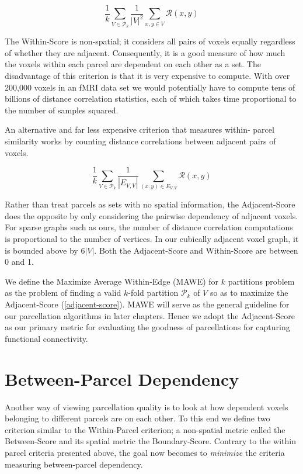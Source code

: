 \begin{definition} \label{within-score}
\[ \frac{1}{k} \sum_{V \in \mathcal{P}_k}
   \frac{1}{|V|^2} \sum_{x,y \in V} \mathcal{R}(x,y)
\]
\end{definition}

The Within-Score is non-spatial; it considers all pairs of voxels
equally regardless of whether they are adjacent. Consequently, it is a
good measure of how much the voxels within each parcel are dependent on
each other as a set. The disadvantage of this criterion is that it is
very expensive to compute. With over 200,000 voxels in an fMRI data set
we would potentially have to compute tens of billions of distance
correlation statistics, each of which takes time proportional to the
number of samples squared.

An alternative and far less expensive criterion that measures within-
parcel similarity works by counting distance correlations between
adjacent pairs of voxels.

\begin{definition} \label{adjacent-score}
\[ \frac{1}{k} \sum_{V \in \mathcal{P}_k}
   \frac{1}{|E_{V,V}|} \sum_{(x,y) \in E_{V,V}} \mathcal{R}(x,y)
\]
\end{definition}

Rather than treat parcels as sets with no spatial information, the
Adjacent-Score does the opposite by only considering the pairwise
dependency of adjacent voxels. For sparse graphs such as ours, the
number of distance correlation computations is proportional to the
number of vertices. In our cubically adjacent voxel graph, it is bounded
above by $6 |V|$. Both the Adjacent-Score and Within-Score are
between 0 and 1.

We define the Maximize Average Within-Edge (MAWE) for $k$ partitions
problem as the problem of finding a valid $k$-fold partition
$\mathcal{P}_k$ of $V$ so as to maximize the Adjacent-Score
(\ref{adjacent-score}). MAWE will serve as the general guideline for our
parcellation algorithms in later chapters. Hence we adopt the
Adjacent-Score as our primary metric for evaluating the goodness of
parcellations for capturing functional connectivity.

\section{Between-Parcel Dependency}

Another way of viewing parcellation quality is to look at how
dependent voxels belonging to different parcels are on each other. To
this end we define two criterion similar to the Within-Parcel criterion;
a non-spatial metric called the Between-Score and its spatial metric
the Boundary-Score. Contrary to the within parcel criteria presented
above, the goal now becomes to \textit{minimize} the criteria measuring
between-parcel dependency.

